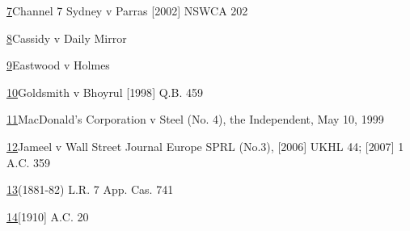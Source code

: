 \documentclass[]{article}
\begin{document}
\hyperref[sdfootnote7anc]{7}Channel 7 Sydney v Parras {[}2002{]} NSWCA
202

\hyperref[sdfootnote8anc]{8}Cassidy v Daily Mirror

\hyperref[sdfootnote9anc]{9}Eastwood v Holmes

\hyperref[sdfootnote10anc]{10}Goldsmith v Bhoyrul {[}1998{]} Q.B. 459

\hyperref[sdfootnote11anc]{11}MacDonald's Corporation v Steel (No. 4),
the Independent, May 10, 1999

\hyperref[sdfootnote12anc]{12}Jameel v Wall Street Journal Europe SPRL
(No.3), {[}2006{]} UKHL 44; {[}2007{]} 1 A.C. 359

\hyperref[sdfootnote13anc]{13}(1881-82) L.R. 7 App. Cas. 741

\hyperref[sdfootnote14anc]{14}{[}1910{]} A.C. 20
\end{document}
